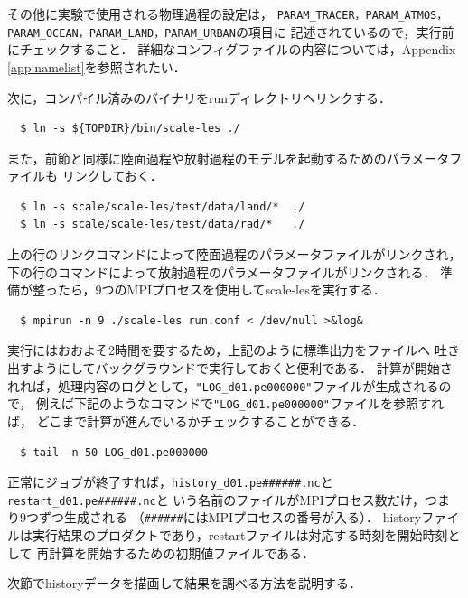 その他に実験で使用される物理過程の設定は，
\verb|PARAM_TRACER，PARAM_ATMOS，PARAM_OCEAN，PARAM_LAND，PARAM_URBAN|の項目に
記述されているので，実行前にチェックすること．
詳細なコンフィグファイルの内容については，Appendix \ref{app:namelist}を参照されたい．


次に，コンパイル済みのバイナリをrunディレクトリへリンクする．

\begin{verbatim}
  $ ln -s ${TOPDIR}/bin/scale-les ./
\end{verbatim}

また，前節と同様に陸面過程や放射過程のモデルを起動するためのパラメータファイルも
リンクしておく．

\begin{verbatim}
  $ ln -s scale/scale-les/test/data/land/*  ./
  $ ln -s scale/scale-les/test/data/rad/*   ./
\end{verbatim}
上の行のリンクコマンドによって陸面過程のパラメータファイルがリンクされ，
下の行のコマンドによって放射過程のパラメータファイルがリンクされる．
準備が整ったら，9つのMPIプロセスを使用してscale-lesを実行する．
\begin{verbatim}
  $ mpirun -n 9 ./scale-les run.conf < /dev/null >&log&
\end{verbatim}


実行にはおおよそ2時間を要するため，上記のように標準出力をファイルへ
吐き出すようにしてバックグラウンドで実行しておくと便利である．
計算が開始されれば，処理内容のログとして，\verb|"LOG_d01.pe000000"|ファイルが生成されるので，
例えば下記のようなコマンドで\verb|"LOG_d01.pe000000"|ファイルを参照すれば，
どこまで計算が進んでいるかチェックすることができる．
\begin{verbatim}
  $ tail -n 50 LOG_d01.pe000000
\end{verbatim}
正常にジョブが終了すれば，\verb|history_d01.pe######.nc|と\verb|restart_d01.pe######.nc|と
いう名前のファイルがMPIプロセス数だけ，つまり9つずつ生成される
（\verb|######|にはMPIプロセスの番号が入る）．
historyファイルは実行結果のプロダクトであり，restartファイルは対応する時刻を開始時刻として
再計算を開始するための初期値ファイルである．

次節でhistoryデータを描画して結果を調べる方法を説明する．


